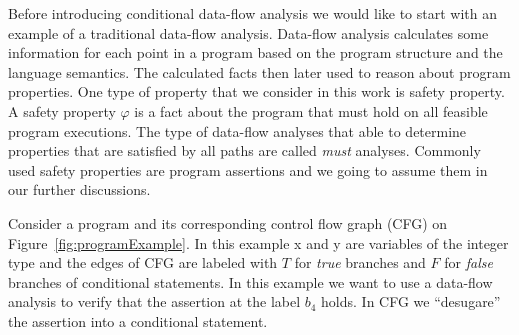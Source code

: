 

Before introducing conditional data-flow analysis we would like to start with an example of a traditional data-flow analysis. Data-flow analysis calculates some information for each point in a program based on the program structure and  the language semantics. The calculated facts then later used to reason about program properties. One type of property that we consider in this work is safety property. A safety property $\varphi$ is a fact about the program that must hold on all feasible program executions. The type of data-flow analyses that able to determine properties that are satisfied by all paths are called {\em must} analyses. Commonly used safety properties are program assertions and we going to assume them in our further discussions.

Consider a program and its corresponding control flow graph (CFG) on Figure~\ref{fig:programExample}. In this example x and y are variables of the integer type and the edges of CFG are labeled with $T$ for {\em true} branches and $F$ for {\em false} branches of conditional statements. In this example we want to use a data-flow analysis to verify that the assertion at the label $b_4$ holds. In CFG we ``desugare'' the assertion into a conditional statement. 

